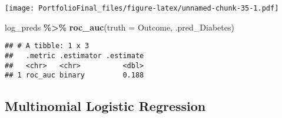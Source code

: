 \documentclass[
]{article}
\newenvironment{Shaded}{\begin{snugshade}}{\end{snugshade}}
\newcommand{\AttributeTok}[1]{\textcolor[rgb]{0.13,0.29,0.53}{#1}}
\newcommand{\FunctionTok}[1]{\textcolor[rgb]{0.13,0.29,0.53}{\textbf{#1}}}
\newcommand{\NormalTok}[1]{#1}
\newcommand{\SpecialCharTok}[1]{\textcolor[rgb]{0.81,0.36,0.00}{\textbf{#1}}}
\begin{document}
\texttt{[image: PortfolioFinal\_files/figure-latex/unnamed-chunk-35-1.pdf]}

\begin{Shaded}
\begin{Highlighting}[]
\NormalTok{log\_preds }\SpecialCharTok{\%\textgreater{}\%}
  \FunctionTok{roc\_auc}\NormalTok{(}\AttributeTok{truth =}\NormalTok{ Outcome, .pred\_Diabetes)}
\end{Highlighting}
\end{Shaded}

\begin{verbatim}
## # A tibble: 1 x 3
##   .metric .estimator .estimate
##   <chr>   <chr>          <dbl>
## 1 roc_auc binary         0.188
\end{verbatim}

\subsection{Multinomial Logistic
Regression}\label{multinomial-logistic-regression}
\end{document}
